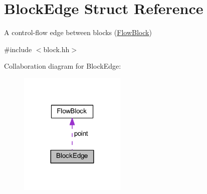 \hypertarget{struct_block_edge}{}\section{Block\+Edge Struct Reference}
\label{struct_block_edge}


A control-\/flow edge between blocks (\mbox{\hyperlink{class_flow_block}{Flow\+Block}})  




{\ttfamily \#include $<$block.\+hh$>$}



Collaboration diagram for Block\+Edge\+:
\nopagebreak
\begin{figure}[H]
\begin{center}
\leavevmode
\includegraphics[width=144pt]{struct_block_edge__coll__graph}
\end{center}
\end{figure}
